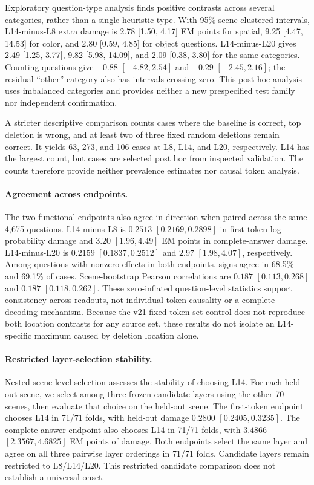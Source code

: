 Exploratory question-type analysis finds positive contrasts across several categories, rather than a single heuristic type. With 95\% scene-clustered intervals, L14-minus-L8 extra damage is 2.78 [1.50, 4.17] EM points for spatial, 9.25 [4.47, 14.53] for color, and 2.80 [0.59, 4.85] for object questions. L14-minus-L20 gives 2.49 [1.25, 3.77], 9.82 [5.98, 14.09], and 2.09 [0.38, 3.80] for the same categories. Counting questions give $-0.88$ $[-4.82, 2.54]$ and $-0.29$ $[-2.45, 2.16]$; the residual ``other'' category also has intervals crossing zero. This post-hoc analysis uses imbalanced categories and provides neither a new prespecified test family nor independent confirmation.

A stricter descriptive comparison counts cases where the baseline is correct, top deletion is wrong, and at least two of three fixed random deletions remain correct. It yields 63, 273, and 106 cases at L8, L14, and L20, respectively. L14 has the largest count, but cases are selected post hoc from inspected validation. The counts therefore provide neither prevalence estimates nor causal token analysis.

\paragraph{Agreement across endpoints.} The two functional endpoints also agree in direction when paired across the same 4,675 questions. L14-minus-L8 is $0.2513$ $[0.2169,0.2898]$ in first-token log-probability damage and $3.20$ $[1.96,4.49]$ EM points in complete-answer damage. L14-minus-L20 is $0.2159$ $[0.1837,0.2512]$ and $2.97$ $[1.98,4.07]$, respectively. Among questions with nonzero effects in both endpoints, signs agree in 68.5\% and 69.1\% of cases. Scene-bootstrap Pearson correlations are $0.187$ $[0.113,0.268]$ and $0.187$ $[0.118,0.262]$. These zero-inflated question-level statistics support consistency across readouts, not individual-token causality or a complete decoding mechanism. Because the v21 fixed-token-set control does not reproduce both location contrasts for any source set, these results do not isolate an L14-specific maximum caused by deletion location alone.

\paragraph{Restricted layer-selection stability.} Nested scene-level selection assesses the stability of choosing L14. For each held-out scene, we select among three frozen candidate layers using the other 70 scenes, then evaluate that choice on the held-out scene. The first-token endpoint chooses L14 in 71/71 folds, with held-out damage $0.2800$ $[0.2405,0.3235]$. The complete-answer endpoint also chooses L14 in 71/71 folds, with $3.4866$ $[2.3567,4.6825]$ EM points of damage. Both endpoints select the same layer and agree on all three pairwise layer orderings in 71/71 folds. Candidate layers remain restricted to L8/L14/L20. This restricted candidate comparison does not establish a universal onset.
